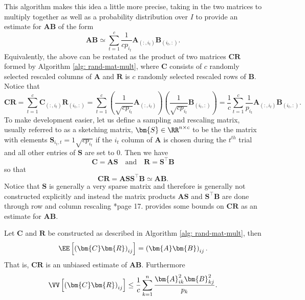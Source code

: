 This algorithm makes this idea a little more precise, taking in the two matrices to multiply together as well as a probability distribution over $I$ to provide an estimate for $\bm{A}\bm{B}$ of the form
\begin{equation*}
    \bm{A}\bm{B} \simeq \sum_{t=1}^{c} \frac{1}{cp_{i_t}} \bm{A}_{(:,i_t)} \bm{B}_{(i_t,:)}.
\end{equation*}
Equivalently, the above can be restated as the product of two matrices $\bm{C} \bm{R}$ formed by Algorithm \ref{alg: rand-mat-mult}, where $\bm{C}$ consists of $c$ randomly selected rescaled columns of $\bm{A}$ and $\bm{R}$ is $c$ randomly selected rescaled rows of $\bm{B}$. Notice that
\begin{equation*}
    \bm{C} \bm{R} = \sum_{t=1}^{c} \bm{C}_{(:,i_t)} \bm{R}_{(i_t,:)} = \sum_{t=1}^{c} \left( \frac{1}{\sqrt{cp_{i_t}}} \bm{A}_{(:,i_t)} \right) \left( \frac{1}{\sqrt{cp_{i_t}}} \bm{B}_{(i_t,:)} \right) = \frac{1}{c} \sum_{t=1}^{c} \frac{1}{p_{i_t}} \bm{A}_{(:,i_t)} \bm{B}_{(i_t,:)}.
\end{equation*}
To make development easier, let us define a sampling and rescaling matrix, usually referred to as a sketching matrix, $\bm{S} \in \RR^{n \times c}$ to be the the matrix with elements $\bm{S}_{i_t , t} = 1 \sqrt{c p_{i_t}}$ if the $i_t$ column of $\bm{A}$ is chosen during the $t^{th}$ trial and all other entries of $\bm{S}$ are set to $0$. Then we have
\begin{equation*}
    \bm{C} = \bm{A} \bm{S} \quad \text{and} \quad \bm{R} = \bm{S}^{\intercal} \bm{B}
\end{equation*}
so that
\begin{equation} \label{eq: nys-sketch-apprx}
    \bm{C} \bm{R} = \bm{A} \bm{S} \bm{S}^{\intercal} \bm{B} \simeq \bm{A} \bm{B}.
\end{equation}
Notice that $\bm{S}$ is generally a very sparse matrix and therefore is generally not constructed explicitly and instead the matrix products $\bm{A} \bm{S}$ and $\bm{S}^{\intercal} \bm{B}$ are done through row and column rescaling \cite{drineas2017lectures}*{page 17}.  provides some bounds on $\bm{C} \bm{R}$ as an estimate for $\bm{A}\bm{B}$.

\begin{lem} \label{lem: rmm-exp-var-bds}
    Let $\bm{C}$ and $\bm{R}$ be constructed as described in Algorithm \ref{alg: rand-mat-mult}, then
    \[
        \EE \left[ \left( \bm{C} \bm{R} \right)_{ij} \right] = \left( \bm{A}\bm{B} \right)_{ij}.
    \]
    That is, $\bm{C} \bm{R}$ is an unbiased estimate of $\bm{A}\bm{B}$. Furthermore
    \[
        \VV \left[ \left( \bm{C} \bm{R} \right)_{ij} \right] \leq \frac{1}{c} \sum_{k=1}^{n} \frac{\bm{A}_{ik}^2 \bm{B}_{kj}^2}{p_k}.
    \]
\end{lem}

